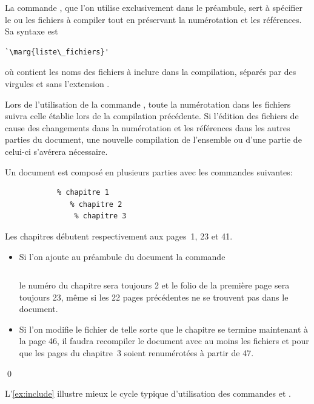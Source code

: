 La commande \cmd{}, que l'on utilise exclusivement dans le
préambule, sert à spécifier le ou les fichiers à compiler tout en
préservant la numérotation et les références. Sa syntaxe est
\begin{lstlisting}
`\marg{liste\_fichiers}'
\end{lstlisting}
où  contient les noms des fichiers à
inclure dans la compilation, séparés par des virgules et sans
l'extension .

Lors de l'utilisation de la commande \cmd{}, toute la
numérotation dans les fichiers  suivra celle
établie lors de la compilation précédente. Si l'édition des fichiers
de  cause des changements dans la numérotation
et les références dans les autres parties du document, une nouvelle
compilation de l'ensemble ou d'une partie de celui-ci s'avérera
nécessaire.

\begin{exemple}
  Un document est composé en plusieurs parties avec les commandes
  suivantes:
\begin{lstlisting}
            % chapitre 1
               % chapitre 2
                % chapitre 3
\end{lstlisting}
  Les chapitres débutent respectivement aux pages~1, 23 et 41.
  \begin{itemize}
  \item Si l'on ajoute au préambule du document la commande
\begin{lstlisting}

\end{lstlisting}
    le numéro du chapitre sera toujours 2 et le folio de
    la première page sera toujours 23, même si les 22 pages
    précédentes ne se trouvent pas dans le document.
  \item Si l'on modifie le fichier  de telle
    sorte que le chapitre se termine maintenant à la page 46, il
    faudra recompiler le document avec au moins les fichiers
     et  pour que les pages du
    chapitre~3 soient renumérotées à partir de 47.
  \end{itemize}
  \qed
\end{exemple}

L'\autoref{ex:include} illustre mieux le cycle typique
d'utilisation des commandes \cmd{} et \cmd{}.



